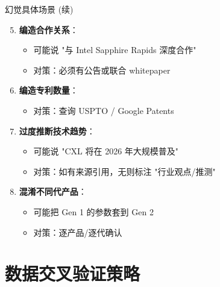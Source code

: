 \documentclass[UTF8,11pt,aspectratio=169]{beamer}
\begin{document}
\begin{frame}{幻觉具体场景 (续)}
    \begin{enumerate}
        \setcounter{enumi}{4}
        \item \textbf{编造合作关系}：
            \begin{itemize}
                \item 可能说 "与 Intel Sapphire Rapids 深度合作"
                \item \alert{对策}：必须有公告或联合 whitepaper
            \end{itemize}

        \item \textbf{编造专利数量}：
            \begin{itemize}
                \item \alert{对策}：查询 USPTO / Google Patents
            \end{itemize}

        \item \textbf{过度推断技术趋势}：
            \begin{itemize}
                \item 可能说 "CXL 将在 2026 年大规模普及"
                \item \alert{对策}：如有来源引用，无则标注 "行业观点/推测"
            \end{itemize}

        \item \textbf{混淆不同代产品}：
            \begin{itemize}
                \item 可能把 Gen 1 的参数套到 Gen 2
                \item \alert{对策}：逐产品/逐代确认
            \end{itemize}
    \end{enumerate}
\end{frame}

\section{数据交叉验证策略}
\end{document}
